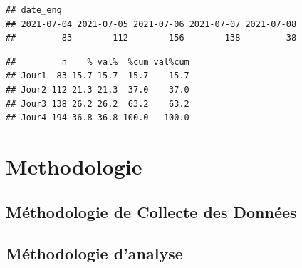 \documentclass[
]{book}
\newenvironment{Shaded}{\begin{snugshade}}{\end{snugshade}}
\newcommand{\AttributeTok}[1]{\textcolor[rgb]{0.77,0.63,0.00}{#1}}
\newcommand{\ConstantTok}[1]{\textcolor[rgb]{0.00,0.00,0.00}{#1}}
\newcommand{\FunctionTok}[1]{\textcolor[rgb]{0.00,0.00,0.00}{#1}}
\newcommand{\NormalTok}[1]{#1}
\newcommand{\OtherTok}[1]{\textcolor[rgb]{0.56,0.35,0.01}{#1}}
\newcommand{\SpecialCharTok}[1]{\textcolor[rgb]{0.00,0.00,0.00}{#1}}
\newcommand{\StringTok}[1]{\textcolor[rgb]{0.31,0.60,0.02}{#1}}
\begin{document}
\begin{verbatim}
## date_enq
## 2021-07-04 2021-07-05 2021-07-06 2021-07-07 2021-07-08 
##         83        112        156        138         38
\end{verbatim}

\begin{Shaded}
\end{Shaded}

\begin{verbatim}
##         n    % val%  %cum val%cum
## Jour1  83 15.7 15.7  15.7    15.7
## Jour2 112 21.3 21.3  37.0    37.0
## Jour3 138 26.2 26.2  63.2    63.2
## Jour4 194 36.8 36.8 100.0   100.0
\end{verbatim}

\hypertarget{methodologie}{%
\chapter{Methodologie}\label{methodologie}}

\hypertarget{muxe9thodologie-de-collecte-des-donnuxe9es}{%
\section{Méthodologie de Collecte des Données}\label{muxe9thodologie-de-collecte-des-donnuxe9es}}

\hypertarget{muxe9thodologie-danalyse}{%
\section{Méthodologie d'analyse}\label{muxe9thodologie-danalyse}}
\end{document}
